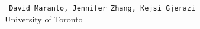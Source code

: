 \begin{center}
    \texttt{
    David Maranto,
    Jennifer Zhang,
    Kejsi Gjerazi
    } \\
    University of Toronto
\end{center}
